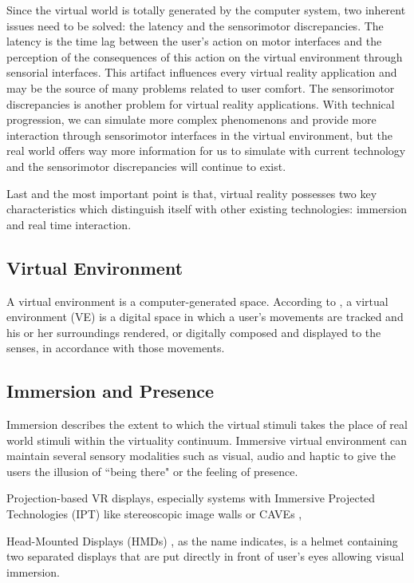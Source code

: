 Since the virtual world is totally generated by the computer system, two inherent issues need to be solved: the latency and the sensorimotor discrepancies. The latency is the time lag between the user's action on motor interfaces and the perception of the consequences of this action on the virtual environment through sensorial interfaces. This artifact influences every virtual reality application and may be the source of many problems related to user comfort. The sensorimotor discrepancies is another problem for virtual reality applications. With technical progression, we can simulate more complex phenomenons and provide more interaction through sensorimotor interfaces in the virtual environment, but the real world offers way more information for us to simulate with current technology and the sensorimotor discrepancies will continue to exist.   

Last and the most important point is that, virtual reality possesses two key characteristics which distinguish itself with other existing technologies: immersion and real time interaction.


\subsection{Virtual Environment}
A virtual environment is a computer-generated space.
According to \citet{Fox2009Guide}, a virtual environment (VE) is a digital space in which a user's movements are tracked and his or her surroundings rendered, or digitally composed and displayed to the senses, in accordance with those movements.



\subsection{Immersion and Presence}
Immersion describes the extent to which the virtual stimuli takes the place of real world stimuli within the virtuality continuum.
Immersive virtual environment can maintain several sensory modalities such as visual, audio and haptic to give the users the illusion of ``being there" or the feeling of presence.

Projection-based VR displays, especially systems with Immersive Projected Technologies (IPT) like stereoscopic image walls or CAVEs \citep{CruzNeira1993SPV}, 

Head-Mounted Displays (HMDs) \citep{Melzer1997HMD}, as the name indicates, is a helmet containing two separated displays that are put directly in front of user's eyes allowing visual immersion.

